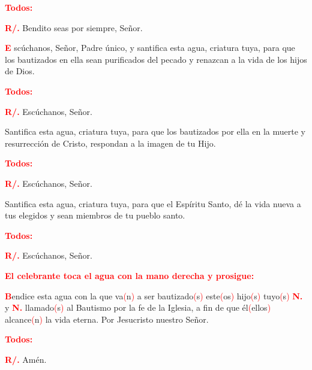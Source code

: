 \documentclass[12pt, letterpaper]{report}
\begin{document}
\large {\bfseries \textcolor{red}{Todos:}}

\noindent
\Large {\bfseries \textcolor{red}{R/.}} \hspace{0.5cm} Bendito seas por siempre, Se\~nor.

\lettrine[lines=1]{\bfseries \textcolor{red}{E}}{} \Large sc\'uchanos, Se\~nor, Padre \'unico, y santifica esta agua, criatura tuya, para que los bautizados en ella sean purificados del pecado y renazcan a la vida de los hijos de Dios.

\large {\bfseries \textcolor{red}{Todos:}}

\noindent
\Large {\bfseries \textcolor{red}{R/.}} \hspace{0.5cm} Esc\'uchanos, Se\~nor.

\Large Santifica esta agua, criatura tuya, para que los bautizados por ella en la muerte y resurrecci\'on de Cristo, respondan a la imagen de tu Hijo.

\large {\bfseries \textcolor{red}{Todos:}}

\noindent
\Large {\bfseries \textcolor{red}{R/.}} \hspace{0.5cm} Esc\'uchanos, Se\~nor.

\Large Santifica esta agua, criatura tuya, para que el Esp\'iritu Santo, d\'e la vida nueva a tus elegidos y sean miembros de tu pueblo santo.

\large {\bfseries \textcolor{red}{Todos:}}

\noindent
\Large {\bfseries \textcolor{red}{R/.}} \hspace{0.5cm} Esc\'uchanos, Se\~nor.

\large {\bfseries \textcolor{red}{El celebrante toca el agua con la mano derecha y prosigue:}}

\lettrine[lines=1]{\bfseries \textcolor{red}{B}}{}\Large endice \Huge{\textcolor{red}{}} \Large esta agua con la que va\textcolor{red}{(}n\textcolor{red}{)} a ser bautizado\textcolor{red}{(}s\textcolor{red}{)} este\textcolor{red}{(}os\textcolor{red}{)} hijo\textcolor{red}{(}s\textcolor{red}{)} tuyo\textcolor{red}{(}s\textcolor{red}{)} {\bfseries \textcolor{red}{N.}} y {\bfseries \textcolor{red}{N.}} llamado\textcolor{red}{(}s\textcolor{red}{)} al Bautismo por la fe de la Iglesia, a fin de que \'el\textcolor{red}{(}ellos\textcolor{red}{)} alcance\textcolor{red}{(}n\textcolor{red}{)} la vida eterna. Por Jesucristo nuestro Se\~nor.

\large {\bfseries \textcolor{red}{Todos:}}

\noindent
\Large {\bfseries \textcolor{red}{R/.}} \hspace{0.5cm} Am\'en.
\end{document}
